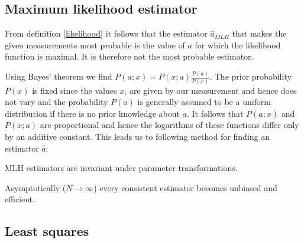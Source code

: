 {\subsection{Maximum likelihood estimator}
	
	From definition \ref{likelihood} it follows that the estimator $\hat{a}_{MLH}$ that makes the given measurements most probable is the value of $a$ for which the likelihood function is maximal. It is therefore not the most probable estimator.
	
	Using Bayes' theorem we find $P(a;x) = P(x;a)\frac{P(a)}{P(x)}$. The prior probability $P(x)$ is fixed since the values $x_i$ are given by our measurement and hence does not vary and the probability $P(a)$ is generally assumed to be a uniform distribution if there is no prior knowledge about $a$. It follows that $P(a;x)$ and $P(x;a)$ are proportional and hence the logarithms of these functions differ only by an additive constant. This leads us to following method for finding an estimator $\hat{a}$:

	\begin{property}
		MLH estimators are invariant under parameter transformations.
	\end{property}
    
	\begin{property}
		Asymptotically ($N\rightarrow\infty$) every consistent estimator becomes unbiased and efficient.
	\end{property}

\subsection{Least squares}
	
}
